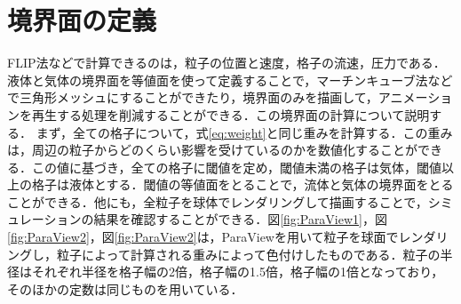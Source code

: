 \documentclass[a4j,12pt]{jreport}
\begin{document}
\section{境界面の定義} \label{sec:boundaly_def}
FLIP法などで計算できるのは，粒子の位置と速度，格子の流速，圧力である．液体と気体の境界面を等値面を使って定義することで，マーチンキューブ法などで三角形メッシュにすることができたり，境界面のみを描画して，アニメーションを再生する処理を削減することができる．この境界面の計算について説明する．
まず，全ての格子について，式\ref{eq:weight}と同じ重みを計算する．この重みは，周辺の粒子からどのくらい影響を受けているのかを数値化することができる．この値に基づき，全ての格子に閾値を定め，閾値未満の格子は気体，閾値以上の格子は液体とする．閾値の等値面をとることで，流体と気体の境界面をとることができる．他にも，全粒子を球体でレンダリングして描画することで，シミュレーションの結果を確認することができる．図\ref{fig:ParaView1}，図\ref{fig:ParaView2}，図\ref{fig:ParaView2}は，ParaViewを用いて粒子を球面でレンダリングし，粒子によって計算される重みによって色付けしたものである．粒子の半径はそれぞれ半径を格子幅の2倍，格子幅の1.5倍，格子幅の1倍となっており，そのほかの定数は同じものを用いている．
\end{document}
